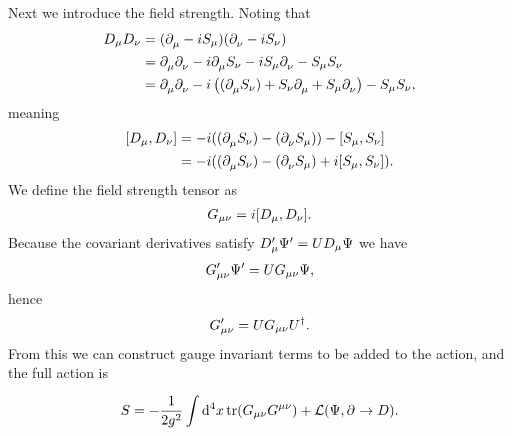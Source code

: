 Next we introduce the field strength. Noting that
\begin{align*}
	D_{\mu}D_{\nu} &= (\partial^{}_{\mu} - iS_{\mu})(\partial^{}_{\nu} - iS_{\nu}) \\
	               &= \partial^{}_{\mu}\partial^{}_{\nu} - i\partial^{}_{\mu}S_{\nu} - iS_{\mu}\partial^{}_{\nu} - S_{\mu}S_{\nu} \\
	               &= \partial^{}_{\mu}\partial^{}_{\nu} - i\left((\partial^{}_{\mu}S_{\nu}) + S_{\nu}\partial^{}_{\mu} + S_{\mu}\partial^{}_{\nu}\right) - S_{\mu}S_{\nu},
\end{align*}
meaning
\begin{align*}
	\comm{D_{\mu}}{D_{\nu}} &= -i((\del{}{\mu}S_{\nu}) - (\del{}{\nu}S_{\mu})) - \comm{S_{\mu}}{S_{\nu}} \\
	                        &= -i((\del{}{\mu}S_{\nu}) - (\del{}{\nu}S_{\mu}) + i\comm{S_{\mu}}{S_{\nu}}).
\end{align*}
We define the field strength tensor as
\begin{align*}
	G_{\mu\nu} = i\comm{D_{\mu}}{D_{\nu}}.
\end{align*}
Because the covariant derivatives satisfy $D_{\mu}^{\prime}\Psi^{\prime} = UD_{\mu}\Psi$ we have
\begin{align*}
	G_{\mu\nu}^{\prime}\Psi^{\prime} = UG_{\mu\nu}\Psi,
\end{align*}
hence
\begin{align*}
	G_{\mu\nu}^{\prime} = UG_{\mu\nu}U^{\dagger}.
\end{align*}
From this we can construct gauge invariant terms to be added to the action, and the full action is
\begin{align*}
	S = -\frac{1}{2g^{2}}\int\limits_{}^{}\dd[4]{x}\tr(G_{\mu\nu}G^{\mu\nu}) + \mathcal{L}(\Psi, \partial^{}_{}\to D).
\end{align*}